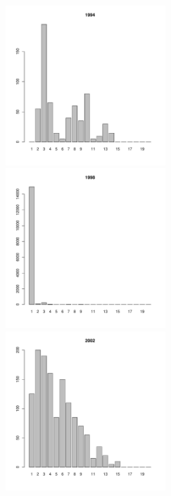 \documentclass[12pt, a4paper]{article}
\begin{document}
\begin{figure}[h]
\begin{multicols}{3}
\hfill
\includegraphics[width=60mm]{../White_Sea/Luvenga_Goreliy/high_1994_.pdf}
\hfill
\includegraphics[width=60mm]{../White_Sea/Luvenga_Goreliy/high_1998_.pdf}
\hfill
\includegraphics[width=60mm]{../White_Sea/Luvenga_Goreliy/high_2002_.pdf}
\end{multicols}



\end{figure}
\end{document}
